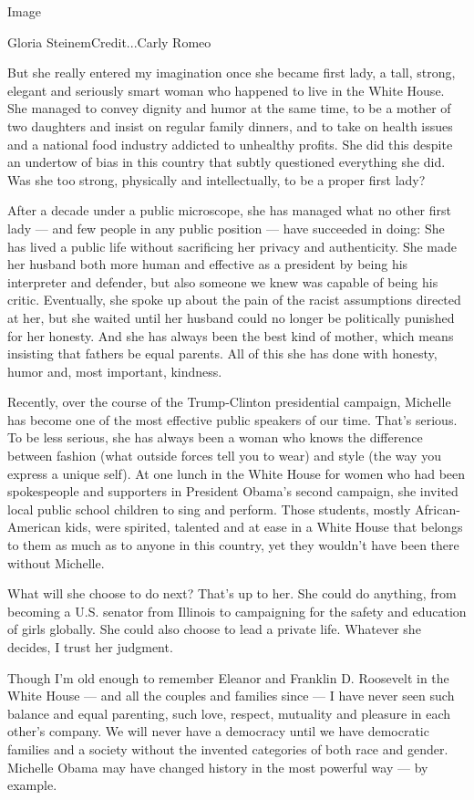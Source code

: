 Image

Gloria SteinemCredit...Carly Romeo

But she really entered my imagination once she became first lady, a
tall, strong, elegant and seriously smart woman who happened to live in
the White House. She managed to convey dignity and humor at the same
time, to be a mother of two daughters and insist on regular family
dinners, and to take on health issues and a national food industry
addicted to unhealthy profits. She did this despite an undertow of bias
in this country that subtly questioned everything she did. Was she too
strong, physically and intellectually, to be a proper first lady?

After a decade under a public microscope, she has managed what no other
first lady --- and few people in any public position --- have succeeded
in doing: She has lived a public life without sacrificing her privacy
and authenticity. She made her husband both more human and effective as
a president by being his interpreter and defender, but also someone we
knew was capable of being his critic. Eventually, she spoke up about the
pain of the racist assumptions directed at her, but she waited until her
husband could no longer be politically punished for her honesty. And she
has always been the best kind of mother, which means insisting that
fathers be equal parents. All of this she has done with honesty, humor
and, most important, kindness.

Recently, over the course of the Trump-Clinton presidential campaign,
Michelle has become one of the most effective public speakers of our
time. That's serious. To be less serious, she has always been a woman
who knows the difference between fashion (what outside forces tell you
to wear) and style (the way you express a unique self). At one lunch in
the White House for women who had been spokespeople and supporters in
President Obama's second campaign, she invited local public school
children to sing and perform. Those students, mostly African-American
kids, were spirited, talented and at ease in a White House that belongs
to them as much as to anyone in this country, yet they wouldn't have
been there without Michelle.

What will she choose to do next? That's up to her. She could do
anything, from becoming a U.S. senator from Illinois to campaigning for
the safety and education of girls globally. She could also choose to
lead a private life. Whatever she decides, I trust her judgment.

Though I'm old enough to remember Eleanor and Franklin D. Roosevelt in
the White House --- and all the couples and families since --- I have
never seen such balance and equal parenting, such love, respect,
mutuality and pleasure in each other's company. We will never have a
democracy until we have democratic families and a society without the
invented categories of both race and gender. Michelle Obama may have
changed history in the most powerful way --- by example.

